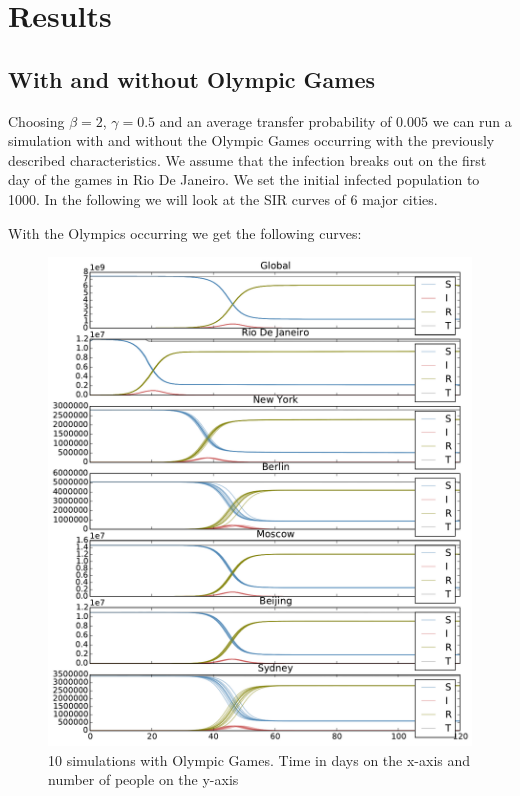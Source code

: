 \section{Results}
\subsection{With and without Olympic Games}
Choosing $\beta=2$, $\gamma=0.5$ and an average transfer probability of $0.005$ we can run a simulation with and without the Olympic Games occurring with the previously described characteristics. We assume that the infection breaks out on the first day of the games in Rio De Janeiro. We set the initial infected population to 1000. In the following we will look at the SIR curves of 6 major cities.

With the Olympics occurring we get the following curves:
\begin{figure}[H]
	\centering
	\includegraphics[width=1.0 \linewidth]{plots/rio-0-18-380000.pdf}
	\caption{10 simulations with Olympic Games. Time in days on the x-axis and number of people on the y-axis}
\end{figure}

